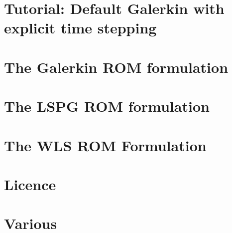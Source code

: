 \let\mypdfximage\pdfximage\def\pdfximage{\immediate\mypdfximage}\documentclass[twoside]{book}
\newcommand{\+}{\discretionary{\mbox{\scriptsize$\hookleftarrow$}}{}{}}
\newcommand{\clearemptydoublepage}{%
  \newpage{\pagestyle{empty}\cleardoublepage}%
}
\begin{document}
\chapter{Tutorial\+: Default Galerkin with explicit time stepping}
\label{md_pages_tutorials_tutorial2}

\chapter{The Galerkin R\+OM formulation}
\label{md_pages_various_formulation_galerkin}

\chapter{The L\+S\+PG R\+OM formulation}
\label{md_pages_various_formulation_lspg}

\chapter{The W\+LS R\+OM Formulation}
\label{md_pages_various_formulation_wls}

\chapter{Licence}
\label{md_pages_various_license}

\chapter{Various}
\label{md_pages_various}


\backmatter
\newpage
{}
\clearemptydoublepage
{}
\printindex
\end{document}
